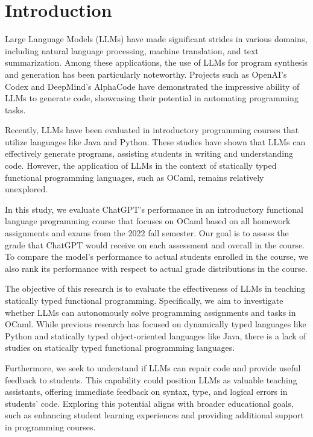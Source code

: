 \documentclass[sigconf,authordraft]{acmart}
\begin{document}
\section{Introduction}

Large Language Models (LLMs) have made significant strides in various domains, including natural language processing, machine translation, and text summarization. Among these applications, the use of LLMs for program synthesis and generation has been particularly noteworthy. Projects such as OpenAI's Codex and DeepMind's AlphaCode have demonstrated the impressive ability of LLMs to generate code, showcasing their potential in automating programming tasks.


Recently, LLMs have been evaluated in introductory programming courses that utilize languages like Java and Python. These studies have shown that LLMs can effectively generate programs, assisting students in writing and understanding code. However, the application of LLMs in the context of statically typed functional programming languages, such as OCaml, remains relatively unexplored.

In this study, we evaluate ChatGPT's performance in an introductory functional language programming course that focuses on OCaml based on all homework assignments and exams from the 2022 fall semester.
Our goal is to assess the grade that ChatGPT would receive on each assessment and overall in the course. To compare the model's performance to actual students enrolled in the course, we also rank its performance with respect to actual grade distributions in the course. 


The objective of this research is to evaluate the effectiveness of LLMs in teaching statically typed functional programming. Specifically, we aim to investigate whether LLMs can autonomously solve programming assignments and tasks in OCaml. While previous research has focused on dynamically typed languages like Python and statically typed object-oriented languages like Java, there is a lack of studies on statically typed functional programming languages.

Furthermore, we seek to understand if LLMs can repair code and provide useful feedback to students. This capability could position LLMs as valuable teaching assistants, offering immediate feedback on syntax, type, and logical errors in students' code. Exploring this potential aligns with broader educational goals, such as enhancing student learning experiences and providing additional support in programming courses.
\end{document}
